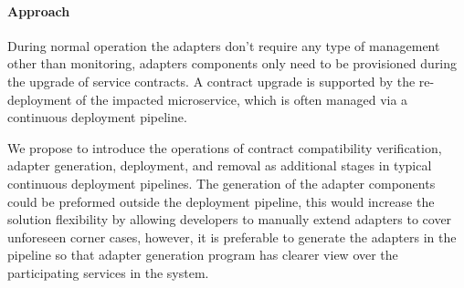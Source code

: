 \paragraph{Approach}
During normal operation the adapters don't require any type of management other than monitoring,
adapters components only need to be provisioned during the upgrade of service contracts.
A contract upgrade is supported by the re-deployment of the impacted microservice, which is often managed via a continuous deployment pipeline.

We propose to introduce the operations of contract compatibility verification, adapter generation, deployment,
and removal as additional stages in typical continuous deployment pipelines.
The generation of the adapter components could be preformed outside the deployment pipeline,
this would increase the solution flexibility by allowing developers to manually extend adapters to cover unforeseen corner cases,
however, it is preferable to generate the adapters in the pipeline so that adapter generation program has clearer view
over the participating services in the system.